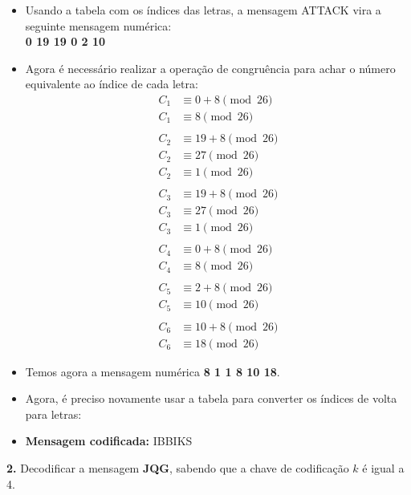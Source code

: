 \begin{itemize}
    \item Usando a tabela com os índices das letras, a mensagem ATTACK vira a seguinte mensagem numérica:\\
          \textbf{0 19 19 0 2 10}
    \item Agora é necessário realizar a operação de congruência para achar o número equivalente ao índice de cada letra:
          \begin{align*}
              C_1 & \equiv 0 + 8 \pmod {26}   \\
              C_1 & \equiv 8 \pmod {26}       \\
              \\
              C_2 & \equiv 19 + 8 \pmod {26}  \\
              C_2 & \equiv 27 \pmod {26}      \\
              C_2 & \equiv 1 \pmod {26}       \\
              \\
              C_3 & \equiv 19 + 8 \pmod {26}  \\
              C_3 & \equiv 27 \pmod {26}      \\
              C_3 & \equiv 1 \pmod {26}       \\
              \\
              C_4 & \equiv 0 + 8 \pmod {26}   \\
              C_4 & \equiv 8 \pmod {26}       \\
              \\
              C_5 & \equiv 2 + 8 \pmod {26}   \\
              C_5 & \equiv 10 \pmod {26}      \\
              \\
              C_6 & \equiv 10 + 8  \pmod {26} \\
              C_6 & \equiv 18 \pmod {26}
          \end{align*}
    \item Temos agora a mensagem numérica \textbf{8 1 1 8 10 18}.
    \item Agora, é preciso novamente usar a tabela para converter os índices de volta para letras:
    \item \textbf{Mensagem codificada:} IBBIKS
\end{itemize}
\vspace{24pt}
\textbf{2.} Decodificar a mensagem \textbf{JQG}, sabendo que a chave de codificação $k$ é igual a 4.

